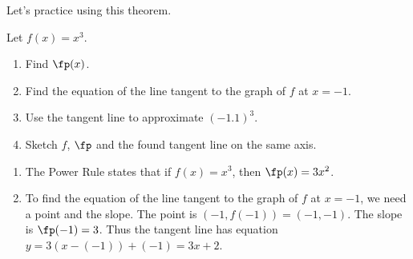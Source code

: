 
Let's practice using this theorem.

\begin{example}\label{ex_deriv_rule1}%
Let $f(x)=x^3$. 
\begin{enumerate}
	\item	Find $\fp(x)$.
	\item	Find the equation of the line tangent to the graph of $f$ at $x=-1$. 
	\item	Use the tangent line to approximate $(-1.1)^3$.
	\item	Sketch $f$, $\fp$ and the found tangent line on the same axis.
\end{enumerate}
\solution
\begin{enumerate}
	\item	The Power Rule states that if $f(x) = x^3$, then $\fp(x) = 3x^2$. 
	\item	To find the equation of the line tangent to the graph of $f$ at $x=-1$, we need a point and the slope. The point is $(-1,f(-1)) = (-1, -1)$. The slope is $\fp(-1)= 3$. Thus the tangent line has equation $y = 3(x-(-1))+(-1) = 3x+2$. 


\end{enumerate}
\end{example}
